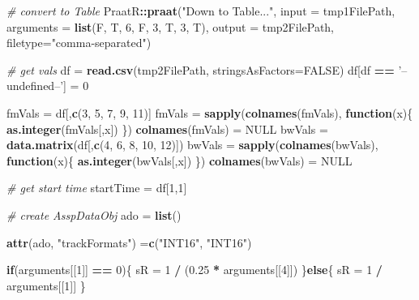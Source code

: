 \documentclass[]{book}
\newenvironment{Shaded}{\begin{snugshade}}{\end{snugshade}}
\newcommand{\CommentTok}[1]{\textcolor[rgb]{0.56,0.35,0.01}{\textit{#1}}}
\newcommand{\ControlFlowTok}[1]{\textcolor[rgb]{0.13,0.29,0.53}{\textbf{#1}}}
\newcommand{\DataTypeTok}[1]{\textcolor[rgb]{0.13,0.29,0.53}{#1}}
\newcommand{\DecValTok}[1]{\textcolor[rgb]{0.00,0.00,0.81}{#1}}
\newcommand{\FloatTok}[1]{\textcolor[rgb]{0.00,0.00,0.81}{#1}}
\newcommand{\KeywordTok}[1]{\textcolor[rgb]{0.13,0.29,0.53}{\textbf{#1}}}
\newcommand{\NormalTok}[1]{#1}
\newcommand{\OperatorTok}[1]{\textcolor[rgb]{0.81,0.36,0.00}{\textbf{#1}}}
\newcommand{\OtherTok}[1]{\textcolor[rgb]{0.56,0.35,0.01}{#1}}
\newcommand{\StringTok}[1]{\textcolor[rgb]{0.31,0.60,0.02}{#1}}
\begin{document}
\begin{Shaded}
\begin{Highlighting}[]
  \CommentTok{# convert to Table}
\NormalTok{  PraatR}\OperatorTok{::}\KeywordTok{praat}\NormalTok{(}\StringTok{"Down to Table..."}\NormalTok{,}
                \DataTypeTok{input =}\NormalTok{ tmp1FilePath,}
                \DataTypeTok{arguments =} \KeywordTok{list}\NormalTok{(F, T, }\DecValTok{6}\NormalTok{, F, }\DecValTok{3}\NormalTok{, T, }\DecValTok{3}\NormalTok{, T), }
                \DataTypeTok{output =}\NormalTok{ tmp2FilePath,}
                \DataTypeTok{filetype=}\StringTok{"comma-separated"}\NormalTok{)}
  
  \CommentTok{# get vals}
\NormalTok{  df =}\StringTok{ }\KeywordTok{read.csv}\NormalTok{(tmp2FilePath, }\DataTypeTok{stringsAsFactors=}\OtherTok{FALSE}\NormalTok{)}
\NormalTok{  df[df }\OperatorTok{==}\StringTok{ '--undefined--'}\NormalTok{] =}\StringTok{ }\DecValTok{0}
  
\NormalTok{  fmVals =}\StringTok{ }\NormalTok{df[,}\KeywordTok{c}\NormalTok{(}\DecValTok{3}\NormalTok{, }\DecValTok{5}\NormalTok{, }\DecValTok{7}\NormalTok{, }\DecValTok{9}\NormalTok{, }\DecValTok{11}\NormalTok{)]}
\NormalTok{  fmVals =}\StringTok{ }\KeywordTok{sapply}\NormalTok{(}\KeywordTok{colnames}\NormalTok{(fmVals), }\ControlFlowTok{function}\NormalTok{(x)\{}
    \KeywordTok{as.integer}\NormalTok{(fmVals[,x])}
\NormalTok{  \})}
  \KeywordTok{colnames}\NormalTok{(fmVals) =}\StringTok{ }\OtherTok{NULL}
\NormalTok{  bwVals =}\StringTok{ }\KeywordTok{data.matrix}\NormalTok{(df[,}\KeywordTok{c}\NormalTok{(}\DecValTok{4}\NormalTok{, }\DecValTok{6}\NormalTok{, }\DecValTok{8}\NormalTok{, }\DecValTok{10}\NormalTok{, }\DecValTok{12}\NormalTok{)])}
\NormalTok{  bwVals =}\StringTok{ }\KeywordTok{sapply}\NormalTok{(}\KeywordTok{colnames}\NormalTok{(bwVals), }\ControlFlowTok{function}\NormalTok{(x)\{}
    \KeywordTok{as.integer}\NormalTok{(bwVals[,x])}
\NormalTok{  \})}
  \KeywordTok{colnames}\NormalTok{(bwVals) =}\StringTok{ }\OtherTok{NULL}
  
  \CommentTok{# get start time}
\NormalTok{  startTime =}\StringTok{ }\NormalTok{df[}\DecValTok{1}\NormalTok{,}\DecValTok{1}\NormalTok{]}
  
  \CommentTok{# create AsspDataObj}
\NormalTok{  ado =}\StringTok{ }\KeywordTok{list}\NormalTok{()}
  
  \KeywordTok{attr}\NormalTok{(ado, }\StringTok{"trackFormats"}\NormalTok{) =}\KeywordTok{c}\NormalTok{(}\StringTok{"INT16"}\NormalTok{, }\StringTok{"INT16"}\NormalTok{)}
  
  \ControlFlowTok{if}\NormalTok{(arguments[[}\DecValTok{1}\NormalTok{]] }\OperatorTok{==}\StringTok{ }\DecValTok{0}\NormalTok{)\{}
\NormalTok{    sR =}\StringTok{ }\DecValTok{1} \OperatorTok{/}\StringTok{ }\NormalTok{(}\FloatTok{0.25} \OperatorTok{*}\StringTok{ }\NormalTok{arguments[[}\DecValTok{4}\NormalTok{]])}
\NormalTok{  \}}\ControlFlowTok{else}\NormalTok{\{}
\NormalTok{    sR =}\StringTok{ }\DecValTok{1} \OperatorTok{/}\StringTok{ }\NormalTok{arguments[[}\DecValTok{1}\NormalTok{]]}
\NormalTok{  \}}
  

\end{Highlighting}
\end{Shaded}
\end{document}
